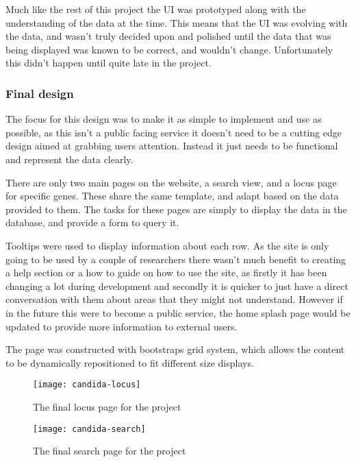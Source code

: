 Much like the rest of this project the UI was prototyped along with the understanding of the data at the time. This means that the UI was evolving with the data, and wasn't truly decided upon and polished until the data that was being displayed was known to be correct, and wouldn't change. Unfortunately this didn't happen until quite late in the project. 

\subsubsection{Final design}
The focus for this design was to make it as simple to implement and use as possible, as this isn't a public facing service it doesn't need to be a cutting edge design aimed at grabbing users attention. Instead it just needs to be functional and represent the data clearly. 

There are only two main pages on the website, a search view, and a locus page for specific genes. These share the same template, and adapt based on the data provided to them. The tasks for these pages are simply to display the data in the database, and provide a form to query it.

Tooltips were used to display information about each row. As the site is only going to be used by a couple of researchers there wasn't much benefit to creating a help section or a how to guide on how to use the site, as firstly it has been changing a lot during development and secondly it is quicker to just have a direct conversation with them about areas that they might not understand. However if in the future this were to become a public service, the home splash page would be updated to provide more information to external users.

The page was constructed with bootstraps\cite{bootstrap} grid system, which allows the content to be dynamically repositioned to fit different size displays.

\begin{figure}[H]
\begin{center}
\texttt{[image: candida-locus]}
\caption{The final locus page for the project}
\end{center}
\end{figure}

\begin{figure}[H]
\begin{center}
\texttt{[image: candida-search]}
\caption{The final search page for the project}
\end{center}
\end{figure}

